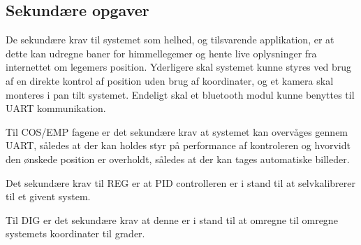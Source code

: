 \subsection{Sekundære opgaver}

De sekundære krav til systemet som helhed, og tilsvarende applikation, er at dette kan udregne baner for himmellegemer og hente live oplysninger fra internettet om legemers position. Yderligere skal systemet kunne styres ved brug af en direkte kontrol af position uden brug af koordinater, og et kamera skal monteres i pan tilt systemet. Endeligt skal et bluetooth modul kunne benyttes til UART kommunikation.

Til COS/EMP fagene er det sekundære krav at systemet kan overvåges gennem UART, således at der kan holdes styr på performance af kontroleren og hvorvidt den ønskede position er overholdt, således at der kan tages automatiske billeder.

Det sekundære krav til REG er at PID controlleren er i stand til at selvkalibrerer til et givent system.

Til DIG er det sekundære krav at denne er i stand til at omregne til omregne systemets koordinater til grader.

%	

